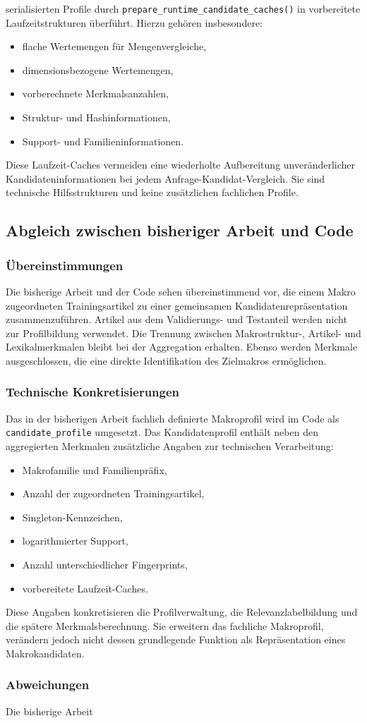 serialisierten Profile durch \texttt{prepare\_runtime\_candidate\_caches()} in vorbereitete Laufzeitstrukturen überführt. Hierzu gehören insbesondere: \begin{itemize} \item flache Wertemengen für Mengenvergleiche, \item dimensionsbezogene Wertemengen, \item vorberechnete Merkmalsanzahlen, \item Struktur- und Hashinformationen, \item Support- und Familieninformationen. \end{itemize} Diese Laufzeit-Caches vermeiden eine wiederholte Aufbereitung unveränderlicher Kandidateninformationen bei jedem Anfrage-Kandidat-Vergleich. Sie sind technische Hilfsstrukturen und keine zusätzlichen fachlichen Profile. \subsection{Abgleich zwischen bisheriger Arbeit und Code} \label{subsec:abgleich_kandidatenprofile} \subsubsection*{Übereinstimmungen} Die bisherige Arbeit und der Code sehen übereinstimmend vor, die einem Makro zugeordneten Trainingsartikel zu einer gemeinsamen Kandidatenrepräsentation zusammenzuführen. Artikel aus dem Validierungs- und Testanteil werden nicht zur Profilbildung verwendet. Die Trennung zwischen Makrostruktur-, Artikel- und Lexikalmerkmalen bleibt bei der Aggregation erhalten. Ebenso werden Merkmale ausgeschlossen, die eine direkte Identifikation des Zielmakros ermöglichen. \subsubsection*{Technische Konkretisierungen} Das in der bisherigen Arbeit fachlich definierte Makroprofil wird im Code als \texttt{candidate\_profile} umgesetzt. Das Kandidatenprofil enthält neben den aggregierten Merkmalen zusätzliche Angaben zur technischen Verarbeitung: \begin{itemize} \item Makrofamilie und Familienpräfix, \item Anzahl der zugeordneten Trainingsartikel, \item Singleton-Kennzeichen, \item logarithmierter Support, \item Anzahl unterschiedlicher Fingerprints, \item vorbereitete Laufzeit-Caches. \end{itemize} Diese Angaben konkretisieren die Profilverwaltung, die Relevanzlabelbildung und die spätere Merkmalsberechnung. Sie erweitern das fachliche Makroprofil, verändern jedoch nicht dessen grundlegende Funktion als Repräsentation eines Makrokandidaten. \subsubsection*{Abweichungen} Die bisherige Arbeit 
